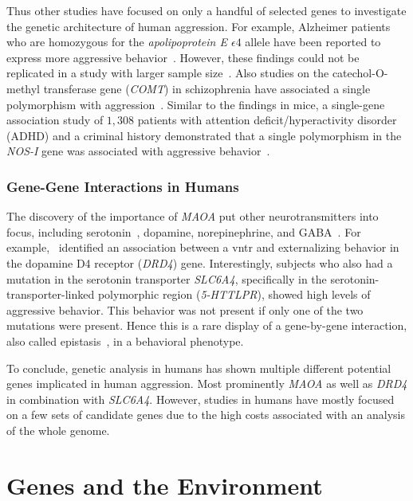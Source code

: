 Thus other studies have focused on only a handful of selected genes to investigate the genetic architecture of human aggression.
For example, Alzheimer patients who are homozygous for the \textit{apolipoprotein E $\epsilon 4$} allele have been reported to express more aggressive behavior~\cite{Craig2004,VanDerFlier2006}.
However, these findings could not be replicated in a study with larger sample size~\cite{Hollingworth2006}.
Also studies on the catechol-O-methyl transferase gene (\textit{COMT}) in schizophrenia have associated a single polymorphism with aggression~\cite{Hirata2013,Calati2011}.
Similar to the findings in mice, a single-gene association study of $1,308$ patients with attention deficit/hyperactivity disorder (ADHD) and a criminal history demonstrated that a single polymorphism in the \textit{NOS-I} gene was associated with aggressive behavior~\cite{Reif2009}.

\subsubsection{Gene-Gene Interactions in Humans}
\label{ssub:Gene-Gene_interactions_in_humans}

The discovery of the importance of \textit{MAOA} put other neurotransmitters into focus, including serotonin~\cite{Murphy2008}, dopamine, norepinephrine, and GABA~\cite{Marino2005,Miczek2002}.
For example,~\citet{Hohmann2009} identified an association between a \acrfull{vntr} and externalizing behavior in the dopamine D4 receptor (\textit{DRD4}) gene.
Interestingly, subjects who also had a mutation in the serotonin transporter \textit{SLC6A4}, specifically in the serotonin-transporter-linked polymorphic region (\textit{5-HTTLPR}), showed high levels of aggressive behavior.
This behavior was not present if only one of the two mutations were present.
Hence this is a rare display of a gene-by-gene interaction, also called epistasis~\cite{Anholt2012}, in a behavioral phenotype.

To conclude, genetic analysis in humans has shown multiple different potential genes implicated in human aggression.
Most prominently \textit{MAOA} as well as \textit{DRD4} in combination with \textit{SLC6A4}.
However, studies in humans have mostly focused on a few sets of candidate genes due to the high costs associated with an analysis of the whole genome.

\section{Genes and the Environment}
\label{sec:gene_environment_interactions}

